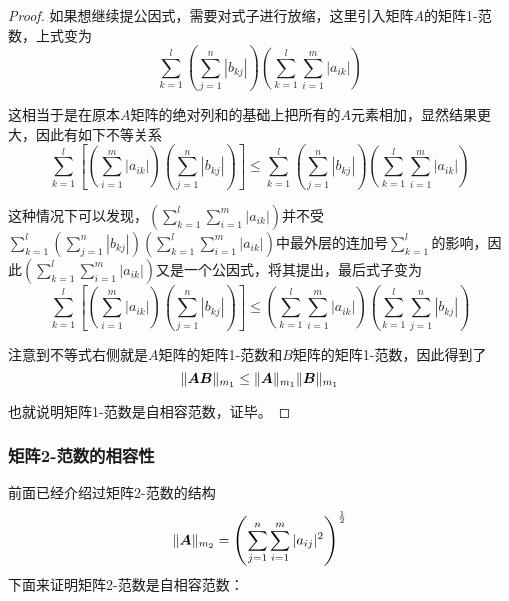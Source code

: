\documentclass[12pt, a4paper, oneside, UTF8]{ctexbook}
\begin{document}
\begin{proof}
    如果想继续提公因式，需要对式子进行放缩，这里引入矩阵$A$的矩阵1-范数，上式变为
    \[\sum_{k=1}^{l}\left(\sum_{j=1}^{n}|b_{kj}|\right)\left(\sum_{k=1}^{l}\sum_{i=1}^{m}|a_{ik}|\right)\]

    这相当于是在原本$A$矩阵的绝对列和的基础上把所有的$A$元素相加，显然结果更大，因此有如下不等关系
    \[\sum_{k=1}^{l}\left[\left(\sum_{i=1}^{m}|a_{ik}|\right)\left(\sum_{j=1}^{n}|b_{kj}|\right)\right]\leq\sum_{k=1}^{l}\left(\sum_{j=1}^{n}|b_{kj}|\right)\left(\sum_{k=1}^{l}\sum_{i=1}^{m}|a_{ik}|\right)\]

    这种情况下可以发现，$\left(\sum_{k=1}^{l}\sum_{i=1}^{m}|a_{ik}|\right)$并不受$\sum_{k=1}^{l}\left(\sum_{j=1}^{n}|b_{kj}|\right)\left(\sum_{k=1}^{l}\sum_{i=1}^{m}|a_{ik}|\right)$中最外层的连加号$\sum_{k=1}^{l}$的影响，因此$\left(\sum_{k=1}^{l}\sum_{i=1}^{m}|a_{ik}|\right)$又是一个公因式，将其提出，最后式子变为
    \[\sum_{k=1}^{l}\left[\left(\sum_{i=1}^{m}|a_{ik}|\right)\left(\sum_{j=1}^{n}|b_{kj}|\right)\right]\leq\left(\sum_{k=1}^{l}\sum_{i=1}^{m}|a_{ik}|\right)\left(\sum_{k=1}^{l}\sum_{j=1}^{n}|b_{kj}|\right)\]

    注意到不等式右侧就是$A$矩阵的矩阵1-范数和$B$矩阵的矩阵1-范数，因此得到了
    \[\Vert\boldsymbol{AB}\Vert_{m_1}\leq\Vert\boldsymbol{A}\Vert_{m_1}\Vert\boldsymbol{B}\Vert_{m_1}\]

    也就说明矩阵1-范数是自相容范数，证毕。
\end{proof}
\subsubsection{矩阵2-范数的相容性}
前面已经介绍过矩阵2-范数的结构
\[\Vert\boldsymbol{A}\Vert_{m_2}=\left(\sum_{j=1}^{n}\sum_{i=1}^{m}|a_{ij}|^2\right)^{\frac{1}{2}}\]
下面来证明矩阵2-范数是自相容范数：
\end{document}
